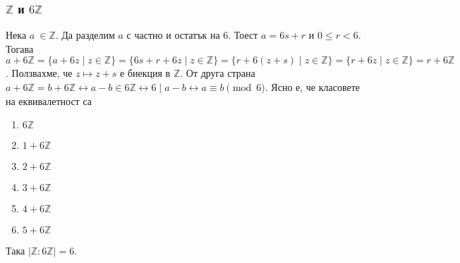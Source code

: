 \documentclass[12pt]{article}
\begin{document}
\subsubsection{\(\mathbb{Z}\) и \(6\mathbb{Z}\)}
Нека \(a\ \in \mathbb{Z}\). Да разделим \(a\) с частно и остатък на \(6\).
Тоест \(a = 6s + r\) и \(0 \leq r < 6\).
Тогава \(a + 6\mathbb{Z} = \{a + 6z \; | \; z \in \mathbb{Z}\} = \{6s + r + 6z \; | \; z \in \mathbb{Z}\} = \{r + 6(z + s) \; | \; z \in \mathbb{Z}\} = \{r + 6z \; | \; z \in \mathbb{Z}\} = r + 6\mathbb{Z}\). Ползвахме, че \(z \mapsto z + s\) е биекция в \(\mathbb{Z}\). От друга страна \\
\(a + 6\mathbb{Z} =  b + 6\mathbb{Z} \longleftrightarrow a - b \in 6\mathbb{Z} \longleftrightarrow 6 \mid a - b \longleftrightarrow a \equiv b \pmod{6}\).
Ясно е, че класовете на еквивалетност са
\begin{enumerate}
    \item \(6\mathbb{Z}\)
     \item \(1 + 6\mathbb{Z}\)
      \item \(2 + 6\mathbb{Z}\)
       \item \(3 + 6\mathbb{Z}\)
        \item \(4 + 6\mathbb{Z}\)
         \item \(5 + 6\mathbb{Z}\)
\end{enumerate}
Така \(|\mathbb{Z} : 6\mathbb{Z}| = 6\).
\end{document}
